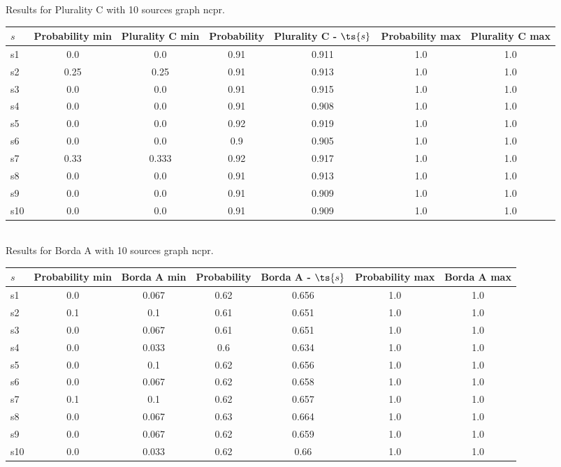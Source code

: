 \documentclass{article}
\begin{document}
\noindent Results for Plurality C with 10 sources graph ncpr.

\noindent\begin{tabular}{|l|c|c|c|c|c|c|}
\hline
$s$& Probability min & Plurality C min & Probability & Plurality C - $\ts{s}$ & Probability max & Plurality C max\\
\hline
s1 &0.0 & 0.0 & 0.91 & 0.911 & 1.0 & 1.0\\
\hline
s2 &0.25 & 0.25 & 0.91 & 0.913 & 1.0 & 1.0\\
\hline
s3 &0.0 & 0.0 & 0.91 & 0.915 & 1.0 & 1.0\\
\hline
s4 &0.0 & 0.0 & 0.91 & 0.908 & 1.0 & 1.0\\
\hline
s5 &0.0 & 0.0 & 0.92 & 0.919 & 1.0 & 1.0\\
\hline
s6 &0.0 & 0.0 & 0.9 & 0.905 & 1.0 & 1.0\\
\hline
s7 &0.33 & 0.333 & 0.92 & 0.917 & 1.0 & 1.0\\
\hline
s8 &0.0 & 0.0 & 0.91 & 0.913 & 1.0 & 1.0\\
\hline
s9 &0.0 & 0.0 & 0.91 & 0.909 & 1.0 & 1.0\\
\hline
s10 &0.0 & 0.0 & 0.91 & 0.909 & 1.0 & 1.0\\
\hline
\end{tabular}\\

\noindent Results for Borda A with 10 sources graph ncpr.

\noindent\begin{tabular}{|l|c|c|c|c|c|c|}
\hline
$s$& Probability min & Borda A min & Probability & Borda A - $\ts{s}$ & Probability max & Borda A max\\
\hline
s1 &0.0 & 0.067 & 0.62 & 0.656 & 1.0 & 1.0\\
\hline
s2 &0.1 & 0.1 & 0.61 & 0.651 & 1.0 & 1.0\\
\hline
s3 &0.0 & 0.067 & 0.61 & 0.651 & 1.0 & 1.0\\
\hline
s4 &0.0 & 0.033 & 0.6 & 0.634 & 1.0 & 1.0\\
\hline
s5 &0.0 & 0.1 & 0.62 & 0.656 & 1.0 & 1.0\\
\hline
s6 &0.0 & 0.067 & 0.62 & 0.658 & 1.0 & 1.0\\
\hline
s7 &0.1 & 0.1 & 0.62 & 0.657 & 1.0 & 1.0\\
\hline
s8 &0.0 & 0.067 & 0.63 & 0.664 & 1.0 & 1.0\\
\hline
s9 &0.0 & 0.067 & 0.62 & 0.659 & 1.0 & 1.0\\
\hline
s10 &0.0 & 0.033 & 0.62 & 0.66 & 1.0 & 1.0\\
\hline
\end{tabular}\\
\end{document}
